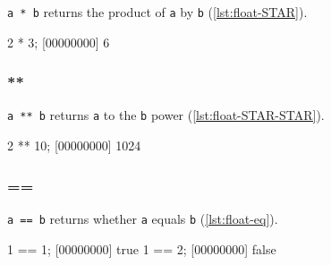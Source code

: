 \lstinline|a * b| returns the product of \lstinline|a| by
\lstinline|b| (\autoref{lst:float-STAR}).

\begin{urbiscript}[caption=Float.'*', label=lst:float-STAR]
2 * 3;
[00000000] 6
\end{urbiscript}

\subsubsection{**}

\lstinline|a ** b| returns \lstinline|a| to the \lstinline|b| power
(\autoref{lst:float-STAR-STAR}).

\begin{urbiscript}[caption=Float.'**', label=lst:float-STAR-STAR]
2 ** 10;
[00000000] 1024
\end{urbiscript}

\subsubsection{==}

\lstinline|a == b| returns whether \lstinline|a| equals \lstinline|b|
(\autoref{lst:float-eq}).

\begin{urbiscript}[caption={Float.'=='}, label=lst:float-eq]
1 == 1;
[00000000] true
1 == 2;
[00000000] false
\end{urbiscript}
